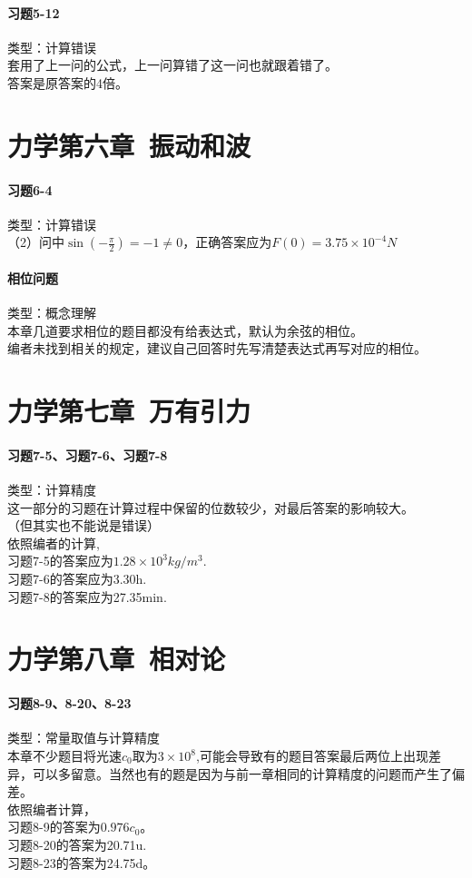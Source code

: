\documentclass[a4paper,11pt]{ctexart}
\begin{document}
\paragraph{习题5-12}类型：计算错误\\
套用了上一问的公式，上一问算错了这一问也就跟着错了。\\
答案是原答案的4倍。

\section{力学第六章\ 振动和波}
\paragraph{习题6-4}类型：计算错误\\
（2）问中$\sin{(-\frac{\pi}{2})} = -1 \neq 0$，正确答案应为$F(0)=3.75 \times 10^{-4}N$

\paragraph{相位问题}类型：概念理解\\
本章几道要求相位的题目都没有给表达式，默认为余弦的相位。\\
编者未找到相关的规定，建议自己回答时先写清楚表达式再写对应的相位。

\section{力学第七章\ 万有引力}
\paragraph{习题7-5、习题7-6、习题7-8}类型：计算精度\\
这一部分的习题在计算过程中保留的位数较少，对最后答案的影响较大。\\（但其实也不能说是错误）\\
依照编者的计算,\\
习题7-5的答案应为$1.28 \times 10^{3} kg/m^{3}$.\\
习题7-6的答案应为3.30h.\\
习题7-8的答案应为27.35min.\\

\section{力学第八章\ 相对论}
\paragraph{习题8-9、8-20、8-23}类型：常量取值与计算精度\\
本章不少题目将光速$c_0$取为$3 \times 10^8$,可能会导致有的题目答案最后两位上出现差异，可以多留意。当然也有的题是因为与前一章相同的计算精度的问题而产生了偏差。\\
依照编者计算，\\
习题8-9的答案为$0.976c_0$。\\
习题8-20的答案为20.71u.\\
习题8-23的答案为24.75d。\\
\end{document}
